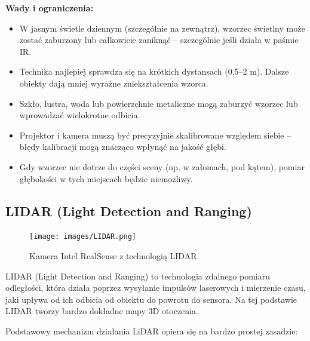 \documentclass[magisterska]{pracadypl}
\begin{document}
\begin{minipage}[t]{\textwidth}
\textbf{Wady i ograniczenia:}
\begin{itemize}
  \item W jasnym świetle dziennym (szczególnie na zewnątrz), wzorzec świetlny może zostać zaburzony lub całkowicie zaniknąć – szczególnie jeśli działa w paśmie IR.

  \item Technika najlepiej sprawdza się na krótkich dystansach (0,5–2 m). Dalsze obiekty dają mniej wyraźne zniekształcenia wzorca.

  \item Szkło, lustra, woda lub powierzchnie metaliczne mogą zaburzyć wzorzec lub wprowadzać wielokrotne odbicia.

  \item Projektor i kamera muszą być precyzyjnie skalibrowane względem siebie – błędy kalibracji mogą znacząco wpłynąć na jakość głębi.

  \item Gdy wzorzec nie dotrze do części sceny (np. w załomach, pod kątem), pomiar głębokości w tych miejscach będzie niemożliwy.
\end{itemize}
\end{minipage}

\subsection{LIDAR (Light Detection and Ranging)}

\begin{figure}[H]  %
    \centering  %
    \texttt{[image: images/LIDAR.png]}  %
    \captionsetup{font=footnotesize}
    \caption[Kamera Intel RealSense L515 z technologią LIDAR. https://cell-kom.com/inne/21454-kamera-internetowa-full-hd-b16-1080p-5900217390350.html]{Kamera Intel RealSense z technologią LIDAR.}
    \label{fig:mono}  %
\end{figure}

LIDAR (Light Detection and Ranging) to technologia zdalnego pomiaru odległości, która działa poprzez wysyłanie impulsów laserowych i mierzenie czasu, jaki upływa od ich odbicia od obiektu do powrotu do sensora. Na tej podstawie LIDAR tworzy bardzo dokładne mapy 3D otoczenia.

Podstawowy mechanizm działania LiDAR opiera się na bardzo prostej zasadzie:
\end{document}
